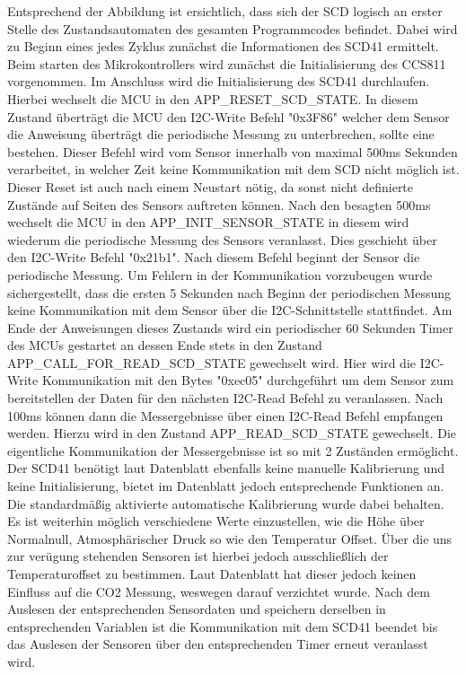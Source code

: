 \documentclass[]{article}
\begin{document}
		Entsprechend der Abbildung ist ersichtlich, dass sich der SCD logisch an erster Stelle des Zustandsautomaten des gesamten Programmcodes befindet. Dabei wird zu Beginn eines jedes Zyklus zunächst die Informationen des SCD41 ermittelt. Beim starten des Mikrokontrollers wird zunächst die Initialisierung des CCS811 vorgenommen. Im Anschluss wird die Initialisierung des SCD41 durchlaufen. Hierbei wechselt die MCU in den APP\_RESET\_SCD\_STATE. In diesem Zustand überträgt die MCU den I2C-Write Befehl "0x3F86" welcher dem Sensor die Anweisung überträgt die periodische Messung zu unterbrechen, sollte eine bestehen. Dieser Befehl wird vom Sensor innerhalb von maximal 500ms Sekunden verarbeitet, in welcher Zeit keine Kommunikation mit dem SCD nicht möglich ist. Dieser Reset ist auch nach einem Neustart nötig, da sonst nicht definierte Zustände auf Seiten des Sensors auftreten können. Nach den besagten 500ms wechselt die MCU in den APP\_INIT\_SENSOR\_STATE in diesem wird wiederum die periodische Messung des Sensors veranlasst. Dies geschieht über den I2C-Write Befehl "0x21b1". Nach diesem Befehl beginnt der Sensor die periodische Messung. Um Fehlern in der Kommunikation vorzubeugen wurde sichergestellt, dass die ersten 5 Sekunden nach Beginn der periodischen Messung keine Kommunikation mit dem Sensor über die I2C-Schnittstelle stattfindet. Am Ende der Anweisungen dieses Zustands wird ein periodischer 60 Sekunden Timer des MCUs gestartet an dessen Ende stets in den Zustand APP\_CALL\_FOR\_READ\_SCD\_STATE gewechselt wird. Hier wird die I2C-Write Kommunikation mit den Bytes "0xec05" durchgeführt um dem Sensor zum bereitstellen der Daten für den nächsten I2C-Read Befehl zu veranlassen. Nach 100ms können dann die Messergebnisse über einen I2C-Read Befehl empfangen werden. Hierzu wird in den Zustand APP\_READ\_SCD\_STATE gewechselt. Die eigentliche Kommunikation der Messergebnisse ist so mit 2 Zuständen ermöglicht. Der SCD41 benötigt laut Datenblatt ebenfalls keine manuelle Kalibrierung und keine Initialisierung, bietet im Datenblatt jedoch entsprechende Funktionen an. Die standardmäßig aktivierte automatische Kalibrierung wurde dabei behalten. Es ist weiterhin möglich verschiedene Werte einzustellen, wie die Höhe über Normalnull, Atmosphärischer Druck so wie den Temperatur Offset. Über die uns zur verügung stehenden Sensoren ist hierbei jedoch ausschließlich der Temperaturoffset zu bestimmen. Laut Datenblatt hat dieser jedoch keinen Einfluss auf die CO2 Messung, weswegen darauf verzichtet wurde. Nach dem Auslesen der entsprechenden Sensordaten und speichern derselben in entsprechenden Variablen ist die Kommunikation mit dem SCD41 beendet bis das Auslesen der Sensoren über den entsprechenden Timer erneut veranlasst wird.
		
\end{document}
